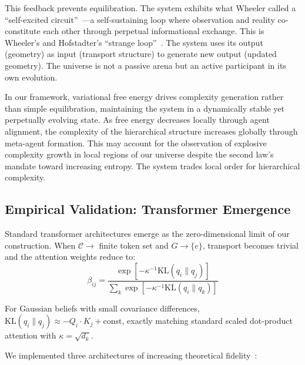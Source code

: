 \documentclass[11pt]{article}
\begin{document}
This feedback prevents equilibration. The system exhibits what Wheeler called a ``self-excited circuit''~\cite{Wheeler1983}---a self-sustaining loop where observation and reality co-constitute each other through perpetual informational exchange. This is Wheeler's and Hofstadter's ``strange loop''~\cite{Hofstadter1979}. The system uses its output (geometry) as input (transport structure) to generate new output (updated geometry). The universe is not a passive arena but an active participant in its own evolution.

In our framework, variational free energy drives complexity generation rather than simple equilibration, maintaining the system in a dynamically stable yet perpetually evolving state. As free energy decreases locally through agent alignment, the complexity of the hierarchical structure increases globally through meta-agent formation. This may account for the observation of explosive complexity growth in local regions of our universe despite the second law's mandate toward increasing entropy. The system trades local order for hierarchical complexity.

\subsection{Empirical Validation: Transformer Emergence}
\label{sec:transformers}

Standard transformer architectures emerge as the zero-dimensional limit of our construction. When $\mathcal{C} \to$ finite token set and $G \to \{e\}$, transport becomes trivial and the attention weights reduce to:
\begin{equation}
\beta_{ij} = \frac{\exp[-\kappa^{-1}\mathrm{KL}(q_i \| q_j)]}{\sum_k\exp[-\kappa^{-1}\mathrm{KL}(q_i \| q_k)]}
\end{equation}

For Gaussian beliefs with small covariance differences, $\mathrm{KL}(q_i \| q_j) \approx -Q_i \cdot K_j + \mathrm{const}$, exactly matching standard scaled dot-product attention with $\kappa = \sqrt{d_k}$.

We implemented three architectures of increasing theoretical fidelity~\cite{Dennis2025transf}:
\end{document}
